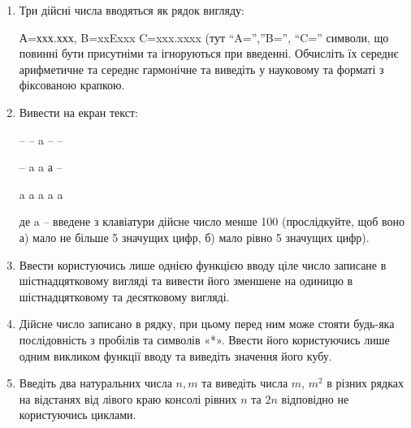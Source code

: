 \documentclass[]{article}
\begin{document}
\begin{enumerate}
\def\labelenumi{\arabic{enumi}.}
\setcounter{enumi}{19}
\item
  Три дійсні числа вводяться як рядок вигляду:

А=ххх.ххх, B=xxExxx C=xxx.xxxx (тут ``A='',''B='', ``C='' символи, що
повинні бути присутніми та ігноруються при введенні. Обчисліть їх
середнє арифметичне та середнє гармонічне та виведіть у науковому та
форматі з фіксованою крапкою.

\item
  Вивести на екран текст:

-- \textbar{} -- \textbar{} a \textbar{} -- \textbar{} --

-- \textbar{} a \textbar{} a \textbar{} а \textbar{} --

a \textbar{} a \textbar{} a \textbar{} a \textbar{} a

де a -- введене з клавіатури дійсне число менше 100 (прослідкуйте, щоб
воно а) мало не більше 5 значущих цифр, б) мало рівно 5 значущих цифр).

\item
Ввести користуючись лише однією функцією вводу ціле число записане в шістнадцятковому вигляді та вивести його зменшене на одиницю в  шістнадцятковому та десятковому вигляді.

\item
Дійсне число записано в рядку, при цьому перед ним може стояти будь-яка послідовність з пробілів та символів «*». Ввести його  користуючись лише одним викликом функції вводу та виведіть значення його кубу.

\item
Введіть два натуральних числа $n, m$ та виведіть числа $m$, $m^{2}$ в різних рядках
 на відстанях від лівого краю консолі рівних $n$ та $2n$ відповідно не користуючись циклами.

\end{enumerate}
\end{document}
